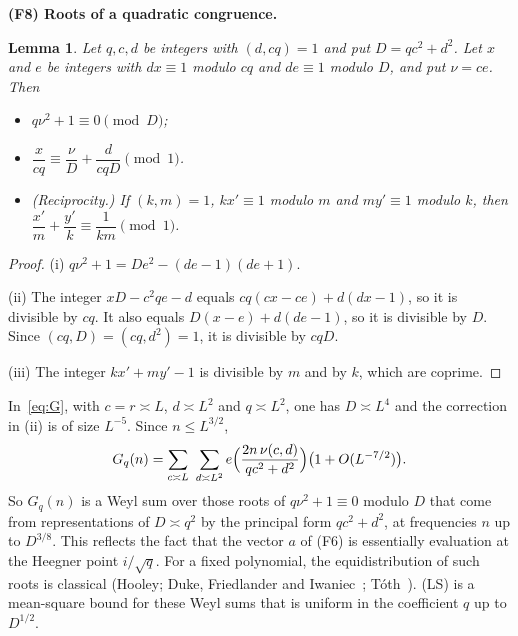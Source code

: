 \documentclass[11pt]{amsart}
\newtheorem{lemma}[theorem]{Lemma}
\theoremstyle{definition}
\theoremstyle{remark}
\numberwithin{equation}{section}
\begin{document}
\medskip
\noindent\textbf{(F8) Roots of a quadratic congruence.}

\begin{lemma}\label{lem:roots}
Let $q,c,d$ be integers with $(d,cq)=1$ and put $D=qc^2+d^2$.  Let $x$ and
$e$ be integers with $dx\equiv1$ modulo $cq$ and $de\equiv1$ modulo $D$,
and put $\nu=ce$.  Then
\begin{itemize}
\item[(i)] $q\nu^2+1\equiv0\pmod D$;
\item[(ii)] $\dfrac{x}{cq}\equiv\dfrac{\nu}{D}+\dfrac{d}{cqD}\pmod 1$.
\item[(iii)] (Reciprocity.)  If $(k,m)=1$, $kx'\equiv1$ modulo $m$ and
$my'\equiv1$ modulo $k$, then
$\dfrac{x'}{m}+\dfrac{y'}{k}\equiv\dfrac1{km}\pmod1$.
\end{itemize}
\end{lemma}
\begin{proof}
(i) $q\nu^2+1=De^2-(de-1)(de+1)$.

(ii) The integer $xD-c^2qe-d$ equals $cq(cx-ce)+d(dx-1)$, so it is divisible
by $cq$.  It also equals $D(x-e)+d(de-1)$, so it is divisible by $D$.  Since
$(cq,D)=(cq,d^2)=1$, it is divisible by $cqD$.

(iii) The integer $kx'+my'-1$ is divisible by $m$ and by $k$, which are
coprime.
\end{proof}

In~\eqref{eq:G}, with $c=r\asymp L$, $d\asymp L^2$ and $q\asymp L^2$, one has
$D\asymp L^4$ and the correction in (ii) is of size $L^{-5}$.  Since
$n\le L^{3/2}$,
\[
 G_q(n)=\sum_{c\asymp L}\ \sum_{d\asymp L^2}
 e\Bigl(\frac{2n\,\nu(c,d)}{qc^2+d^2}\Bigr)\bigl(1+O(L^{-7/2})\bigr).
\]
So $G_q(n)$ is a Weyl sum over those roots of $q\nu^2+1\equiv0$ modulo $D$
that come from representations of $D\asymp q^2$ by the principal form
$qc^2+d^2$, at frequencies $n$ up to $D^{3/8}$.  This reflects the fact that
the vector $a$ of (F6) is essentially evaluation at the Heegner point
$i/\sqrt q$.  For a fixed polynomial, the equidistribution of such roots is
classical (Hooley; Duke, Friedlander and Iwaniec~\cite{DFI95};
T\'oth~\cite{Toth}).  (LS) is a mean-square bound for these Weyl sums that is
uniform in the coefficient $q$ up to $D^{1/2}$.
\end{document}
